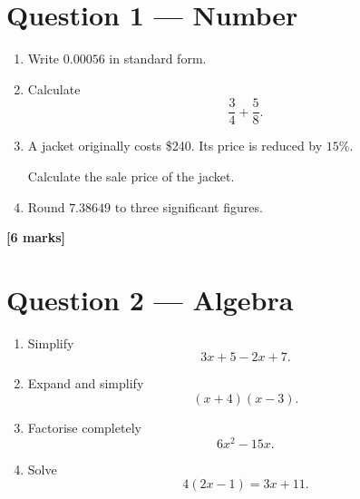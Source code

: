 	\newpage
	
	
	\section*{Question 1 --- Number}
	
	\begin{enumerate}
		\item[(a)] Write \(0.00056\) in standard form.
		
		\vspace{12mm}
		
		\item[(b)] Calculate
		\[
		\frac{3}{4}+\frac{5}{8}.
		\]
		
		\vspace{15mm}
		
		\item[(c)] A jacket originally costs \$240. Its price is reduced by \(15\%\).
		
		Calculate the sale price of the jacket.
		
		\vspace{15mm}
		
		\item[(d)] Round \(7.38649\) to three significant figures.
	\end{enumerate}
	
	\vfill
	
	\noindent
	\textbf{[6 marks]}
	
	\newpage
	
	
	\section*{Question 2 --- Algebra}
	
	\begin{enumerate}
		\item[(a)] Simplify
		\[
		3x+5-2x+7.
		\]
		
		\vspace{10mm}
		
		\item[(b)] Expand and simplify
		\[
		(x+4)(x-3).
		\]
		
		\vspace{15mm}
		
		\item[(c)] Factorise completely
		\[
		6x^2-15x.
		\]
		
		\vspace{15mm}
		
		\item[(d)] Solve
		\[
		4(2x-1)=3x+11.
		\]
	\end{enumerate}
	
